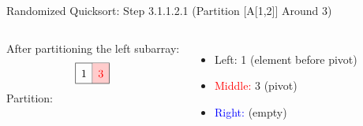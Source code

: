 \begin{frame}{Randomized Quicksort: Step 3.1.1.2.1 (Partition [A[1,2]] Around 3)}
  \begin{columns}[t]
    After partitioning the left subarray:
    \[
      \renewcommand{\arraystretch}{1.5}
      \begin{array}{|c|c|c|}
        \hline
        1 & \cellcolor{red!20}\textcolor{red}{3} \\
        \hline
      \end{array}
    \]
    Partition:
    \begin{itemize}
      \item \textcolor{green!60!black}{Left:} 1 (element before pivot)
      \item \textcolor{red}{Middle:} 3 (pivot)
      \item \textcolor{blue}{Right:} (empty)
    \end{itemize}

    \begin{minipage}[t]{\linewidth}
      \vspace{0pt} %
      \begin{center}


\end{center}
\end{minipage}
\end{columns}
\end{frame}
